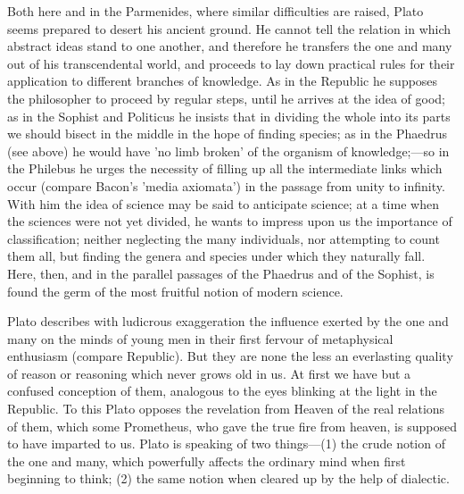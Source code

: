 \documentclass[11pt,letter]{article}
\begin{document}
\par  Both here and in the Parmenides, where similar difficulties are raised, Plato seems prepared to desert his ancient ground. He cannot tell the relation in which abstract ideas stand to one another, and therefore he transfers the one and many out of his transcendental world, and proceeds to lay down practical rules for their application to different branches of knowledge. As in the Republic he supposes the philosopher to proceed by regular steps, until he arrives at the idea of good; as in the Sophist and Politicus he insists that in dividing the whole into its parts we should bisect in the middle in the hope of finding species; as in the Phaedrus (see above) he would have 'no limb broken' of the organism of knowledge;—so in the Philebus he urges the necessity of filling up all the intermediate links which occur (compare Bacon's 'media axiomata') in the passage from unity to infinity. With him the idea of science may be said to anticipate science; at a time when the sciences were not yet divided, he wants to impress upon us the importance of classification; neither neglecting the many individuals, nor attempting to count them all, but finding the genera and species under which they naturally fall. Here, then, and in the parallel passages of the Phaedrus and of the Sophist, is found the germ of the most fruitful notion of modern science.

\par  Plato describes with ludicrous exaggeration the influence exerted by the one and many on the minds of young men in their first fervour of metaphysical enthusiasm (compare Republic). But they are none the less an everlasting quality of reason or reasoning which never grows old in us. At first we have but a confused conception of them, analogous to the eyes blinking at the light in the Republic. To this Plato opposes the revelation from Heaven of the real relations of them, which some Prometheus, who gave the true fire from heaven, is supposed to have imparted to us. Plato is speaking of two things—(1) the crude notion of the one and many, which powerfully affects the ordinary mind when first beginning to think; (2) the same notion when cleared up by the help of dialectic.
\end{document}
